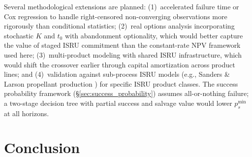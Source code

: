\documentclass[preprint,12pt]{elsarticle}
\begin{document}
Several methodological extensions are planned: (1)~accelerated failure time or Cox regression to handle right-censored non-converging observations more rigorously than conditional statistics; (2)~real options analysis incorporating stochastic $K$ and $t_0$ with abandonment optionality, which would better capture the value of staged ISRU commitment than the constant-rate NPV framework used here; (3)~multi-product modeling with shared ISRU infrastructure, which would shift the crossover earlier through capital amortization across product lines; and (4)~validation against sub-process ISRU models (e.g., Sanders \& Larson propellant production \cite{sanders2015}) for specific ISRU product classes. The success probability framework (\S\ref{sec:success_probability}) assumes all-or-nothing failure; a two-stage decision tree with partial success and salvage value would lower $p_s^{\min}$ at all horizons.

\section{Conclusion}
\label{sec:conclusion}
\end{document}
